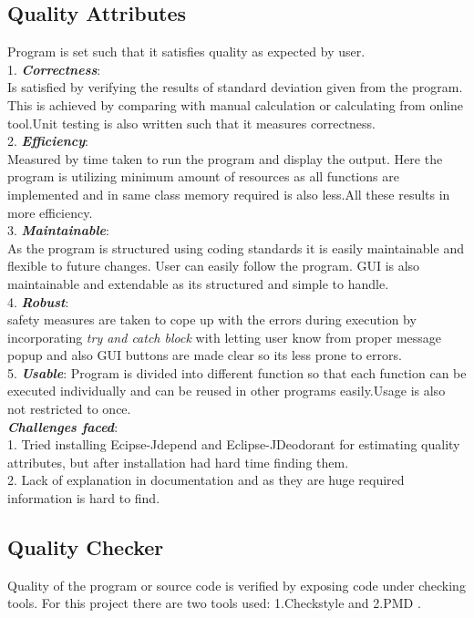 \documentclass[a4paper,12pt]{article}
\begin{document}
\begin{titlepage}
\subsection{Quality Attributes}
Program is set such that it satisfies quality as expected by user.\\
1. \textit{\textbf{Correctness}}: \\Is satisfied by verifying the results of standard deviation given from the program. This is achieved by comparing with manual calculation or calculating from online tool.Unit testing is also written such that it measures correctness.\\
2. \textit{\textbf{Efficiency}}:\\ Measured by time taken to run the program and display the output. Here the program is utilizing minimum amount of resources as all functions are implemented and in same class memory required is also less.All these results in more efficiency.\\
3. \textit{\textbf{Maintainable}}: \\As the program is structured using coding standards it is easily maintainable and flexible to future changes. User can easily follow the program. GUI is also maintainable and extendable as its structured and simple to handle.\\
4. \textit{\textbf{Robust}}: \\safety measures are taken to cope up with the errors during execution by incorporating \textit{try and catch block} with letting user know from proper message popup and also GUI buttons are made clear so its less prone to errors.\\
5. \textit{\textbf{Usable}}: Program is divided into different function so that each function can be executed individually and can be reused in other programs easily.Usage is also not restricted to once.\\
\textbf{\textit{Challenges faced}}:\\
1. Tried installing Ecipse-Jdepend and Eclipse-JDeodorant for estimating quality attributes, but after installation had hard time finding them.\\
2. Lack of explanation in documentation and as they are huge required information is hard to find.

\subsection{Quality Checker}
Quality of the program or source code is verified by exposing code under checking tools. For this project there are two tools used: 1.Checkstyle and  2.PMD . 

\end{titlepage}
\end{document}
